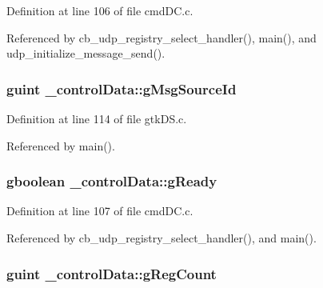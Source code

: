 Definition at line 106 of file cmd\+D\+C.\+c.



Referenced by cb\+\_\+udp\+\_\+registry\+\_\+select\+\_\+handler(), main(), and udp\+\_\+initialize\+\_\+message\+\_\+send().

\subsubsection[{\texorpdfstring{g\+Msg\+Source\+Id}{gMsgSourceId}}]{\setlength{\rightskip}{0pt plus 5cm}guint \+\_\+control\+Data\+::g\+Msg\+Source\+Id}\hypertarget{struct__control_data_a4be65550b087ca645572b8ebc726250d}{}\label{struct__control_data_a4be65550b087ca645572b8ebc726250d}


Definition at line 114 of file gtk\+D\+S.\+c.



Referenced by main().

\subsubsection[{\texorpdfstring{g\+Ready}{gReady}}]{\setlength{\rightskip}{0pt plus 5cm}gboolean \+\_\+control\+Data\+::g\+Ready}\hypertarget{struct__control_data_a04238362a20b6616913d869fc464e4b2}{}\label{struct__control_data_a04238362a20b6616913d869fc464e4b2}


Definition at line 107 of file cmd\+D\+C.\+c.



Referenced by cb\+\_\+udp\+\_\+registry\+\_\+select\+\_\+handler(), and main().

\subsubsection[{\texorpdfstring{g\+Reg\+Count}{gRegCount}}]{\setlength{\rightskip}{0pt plus 5cm}guint \+\_\+control\+Data\+::g\+Reg\+Count}\hypertarget{struct__control_data_a81bfc0d50c23ebe6708e065659d11eb8}{}\label{struct__control_data_a81bfc0d50c23ebe6708e065659d11eb8}


